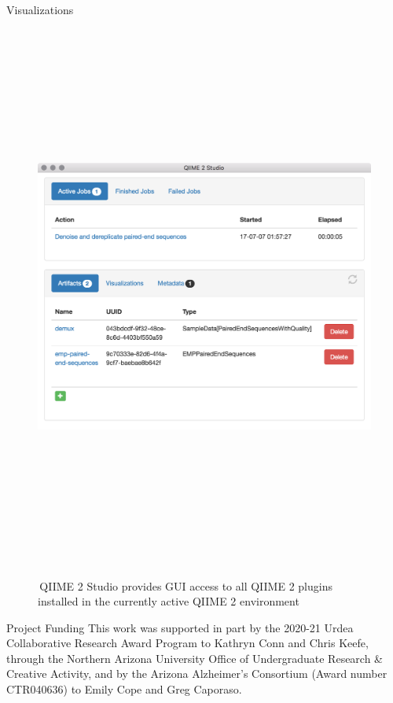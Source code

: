 \documentclass[final]{beamer}
\newlength{\colwidth}
\begin{document}
\begin{frame}[t]
\begin{columns}[t]
\begin{column}{\colwidth}
\begin{block}{Visualizations}
    \begin{figure}[tph!]
      {\includegraphics[height=18cm]{assets/q2studio}}
      \caption{\,QIIME 2 Studio provides GUI access to all QIIME 2 plugins installed in the currently active QIIME 2 environment}
      \label{fig:q2studio}
    \end{figure}
  \end{block}

  \begin{block}{Project Funding}
    This work was supported in part by the 2020-21 Urdea Collaborative
    Research Award Program to Kathryn Conn and Chris Keefe, through the
    Northern Arizona University Office of Undergraduate Research \& Creative
    Activity, and by the Arizona Alzheimer’s Consortium (Award number
    CTR040636) to Emily Cope and Greg Caporaso.
  \end{block}
\end{column}


\end{columns}
\end{frame}
\end{document}
